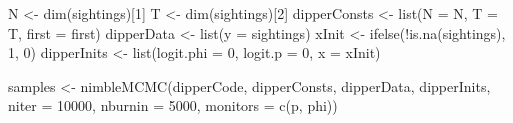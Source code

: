 \documentclass[
  12pt,
]{krantz}
\newenvironment{Shaded}{\begin{snugshade}}{\end{snugshade}}
\newcommand{\AttributeTok}[1]{\textcolor[rgb]{0.77,0.63,0.00}{#1}}
\newcommand{\DecValTok}[1]{\textcolor[rgb]{0.00,0.00,0.81}{#1}}
\newcommand{\FunctionTok}[1]{\textcolor[rgb]{0.00,0.00,0.00}{#1}}
\newcommand{\NormalTok}[1]{#1}
\newcommand{\OtherTok}[1]{\textcolor[rgb]{0.56,0.35,0.01}{#1}}
\newcommand{\SpecialCharTok}[1]{\textcolor[rgb]{0.00,0.00,0.00}{#1}}
\newcommand{\StringTok}[1]{\textcolor[rgb]{0.31,0.60,0.02}{#1}}
\begin{document}
\begin{Shaded}
\begin{Highlighting}[]
\NormalTok{N }\OtherTok{\textless{}{-}} \FunctionTok{dim}\NormalTok{(sightings)[}\DecValTok{1}\NormalTok{]}
\NormalTok{T }\OtherTok{\textless{}{-}} \FunctionTok{dim}\NormalTok{(sightings)[}\DecValTok{2}\NormalTok{]}
\NormalTok{dipperConsts }\OtherTok{\textless{}{-}} \FunctionTok{list}\NormalTok{(}\AttributeTok{N =}\NormalTok{ N, }\AttributeTok{T =}\NormalTok{ T, }\AttributeTok{first =}\NormalTok{ first)}
\NormalTok{dipperData }\OtherTok{\textless{}{-}} \FunctionTok{list}\NormalTok{(}\AttributeTok{y =}\NormalTok{ sightings)}
\NormalTok{xInit }\OtherTok{\textless{}{-}} \FunctionTok{ifelse}\NormalTok{(}\SpecialCharTok{!}\FunctionTok{is.na}\NormalTok{(sightings), }\DecValTok{1}\NormalTok{, }\DecValTok{0}\NormalTok{)}
\NormalTok{dipperInits }\OtherTok{\textless{}{-}} \FunctionTok{list}\NormalTok{(}\AttributeTok{logit.phi =} \DecValTok{0}\NormalTok{, }\AttributeTok{logit.p =} \DecValTok{0}\NormalTok{, }\AttributeTok{x =}\NormalTok{ xInit)}

\NormalTok{samples }\OtherTok{\textless{}{-}} \FunctionTok{nimbleMCMC}\NormalTok{(dipperCode, dipperConsts, dipperData, dipperInits,}
                      \AttributeTok{niter =} \DecValTok{10000}\NormalTok{, }\AttributeTok{nburnin =} \DecValTok{5000}\NormalTok{,}
                      \AttributeTok{monitors =} \FunctionTok{c}\NormalTok{(}\StringTok{\textquotesingle{}p\textquotesingle{}}\NormalTok{, }\StringTok{\textquotesingle{}phi\textquotesingle{}}\NormalTok{))}


\end{Highlighting}
\end{Shaded}
\end{document}
